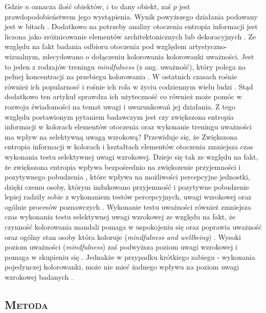 \documentclass[12pt,a4paper,final,oneside,onecolumn,titlepage]{article}
\begin{document}
Gdzie $n$ oznacza ilość obiektów, $i$ to dany obiekt, zaś $p$ jest prawdopodobieństwem jego wystąpienia. Wynik powyższego działania podawany jest w bitach \citep{stamps_entropy_2004}. Dodatkowo na potrzeby analizy otoczenia entropia informacji jest liczona jako zróżnicowanie elementów architektonicznych lub dekoracyjnych \citep{stamps_entropy_2004, stamps_entropy_2002}. Ze względu na fakt badania odbioru otoczenia pod względem artystyczno-wizualnym, zdecydowano o dołączeniu kolorowania kolorowanki uważności. Jest to jeden z rodzajów treningu \textit{mindfulness} (z ang. uważność), który polega na pełnej koncentracji na przebiegu kolorowania \citep{zejmo_praktyka_2022}. W ostatnich czasach rośnie również ich popularnosć i rośnie ich rola w życiu codziennym wielu ludzi \citep{dresler_doing_2019}. Stąd dodatkowo ten artykuł sprawdza ich użyteczność co również może pomóc w rozwoju świadomości na temat uwagi i uwarunkowań jej działania. Z tego względu postawionym pytaniem badawczym jest czy zwiększona entropia informacji w kolorach elementów otoczenia oraz wykonanie treningu uważności ma wpływ na selektywną uwagą wzrokową? Przewiduje się, że Zwiększona entropia informacji w kolorach i kształtach elementów otoczenia zmniejsza czas wykonania testu selektywnej uwagi wzrokowej. Dzieje się tak ze względu na fakt, że zwiększona entropia wpływa bezpośrednio na zwiększenie przyjemności i pozytywnego pobudzenia \citep{stamps_entropy_2004, stamps_entropy_2002}, które wpływa na możliwości percepcyjne jednostki, dzięki czemu osoby, którym indukowano przyjemność i pozytywne pobudzenie lepiej radziły sobie z wykonaniem testów percepcyjnych, uwagi wzrokowej oraz ogólnie procesów poznawczych \citep{mcconnell_upbeat_2011, gavazzi_pleasure_2021}. Wykonanie testu uważności również zmniejsza czas wykonania testu selektywnej uwagi wzrokowej ze względu na fakt, że czynność kolorowania mandali pomaga w uspokojeniu się oraz poprawia uważność oraz ogólny stan osoby która koloruje (\textit{mindfulness and wellbeing}) \citep{carsley_effectiveness_2018, campenni_effects_2020}. Wysoki poziom uważności (\textit{mindfulness}) zaś podwyższa poziom uwagi wzrokowej i pomaga w skupieniu się \citep{campillo_effects_2018, sumantry_meditation_2021}. Jednakże w przypadku krótkiego zabiegu - wykonania pojedynczej kolorowanki, może nie mieć żadnego wpływu na poziom uwagi wzrokowej badanych \citep{thompson_influence_2021}.
\begin{center}
\section*{\large{\textbf{\textsc{Metoda}}}}
\end{center}
\end{document}
